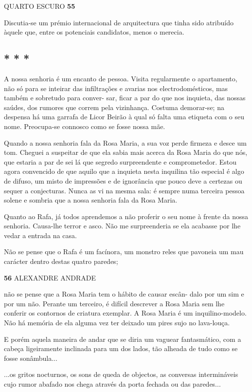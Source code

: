 QUARTO ESCURO \textbf{55}

Discutia-se um prémio internacional de arquitectura que tinha sido
atribuído àquele que, entre os potenciais candidatos, menos o merecia.


\subsection{* * *}

A nossa senhoria é um encanto de pessoa. Visita regularmente o
apartamento, não só para se inteirar das infiltrações e avarias nos
electrodomésticos, mas também e sobretudo para conver- sar, ficar a par
do que nos inquieta, das nossas saúdes, dos rumores que correm pela
vizinhança. Costuma demorar-se; na despensa há uma garrafa de Licor
Beirão à qual só falta uma etiqueta com o seu nome. Preocupa-se connosco
como se fosse nossa mãe.

Quando a nossa senhoria fala da Rosa Maria, a sua voz perde firmeza e
desce um tom. Cheguei a suspeitar de que ela sabia mais acerca da Rosa
Maria do que nós, que estaria a par de sei lá que segredo surpreendente
e comprometedor. Estou agora convencido de que aquilo que a inquieta
nesta inquilina tão especial é algo de difuso, um misto de impressões e
de ignorância que pouco deve a certezas ou sequer a conjecturas. Nunca
as vi na mesma sala: é sempre numa terceira pessoa solene e sombria que
a nossa senhoria fala da Rosa Maria.

Quanto ao Rafa, já todos aprendemos a não proferir o seu nome à frente
da nossa senhoria. Causa-lhe terror e asco. Não me surpreenderia se ela
acabasse por lhe vedar a entrada na casa.

Não se pense que o Rafa é um facínora, um monstro reles que pavoneia um
mau carácter dentro destas quatro paredes;

\textbf{56 }ALEXANDRE ANDRADE

não se pense que a Rosa Maria tem o hábito de causar escân- dalo por um
sim e por um não. Perante um terceiro, é difícil descrever a Rosa Maria
sem lhe conferir os contornos de criatura exemplar. A Rosa Maria é um
inquilino-modelo. Não há memória de ela alguma vez ter deixado um pires
sujo no lava-louça.

E porém aquela maneira de andar que se diria um vaguear fantasmático,
com a cabeça ligeiramente inclinada para um dos lados, tão alheada de
tudo como se fosse sonâmbula...

...os gritos nocturnos, os sons de queda de objectos, as conversas
intermináveis cujo rumor abafado nos chega através da porta fechada ou
das paredes...

